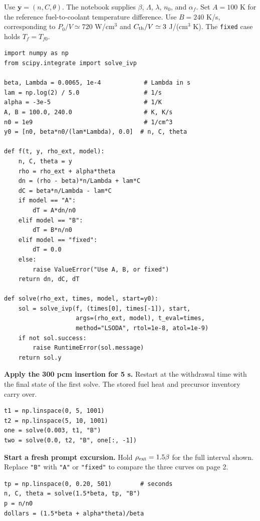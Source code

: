 \documentclass[compact]{ne630handout}
\begin{document}
\begin{handoutflow}
\columnbreak
{}

Use $\mathbf y=(n,C,\theta)$. The notebook supplies $\beta$, $\Lambda$, $\lambda$, $n_0$, and $\alpha_f$. Set $A=100$ K for the reference fuel-to-coolant temperature difference. Use $B=240$ K/s, corresponding to $P_0/V\simeq720$ W/cm$^3$ and $C_{\rm th}/V\simeq3$ J/(cm$^3$ K). The \texttt{fixed} case holds $T_f=T_{f0}$.

\begin{lstlisting}[style=feedback python]
import numpy as np
from scipy.integrate import solve_ivp

beta, Lambda = 0.0065, 1e-4            # Lambda in s
lam = np.log(2) / 5.0                  # 1/s
alpha = -3e-5                          # 1/K
A, B = 100.0, 240.0                    # K, K/s
n0 = 1e9                               # 1/cm^3
y0 = [n0, beta*n0/(lam*Lambda), 0.0]  # n, C, theta

def f(t, y, rho_ext, model):
    n, C, theta = y
    rho = rho_ext + alpha*theta
    dn = (rho - beta)*n/Lambda + lam*C
    dC = beta*n/Lambda - lam*C
    if model == "A":
        dT = A*dn/n0
    elif model == "B":
        dT = B*n/n0
    elif model == "fixed":
        dT = 0.0
    else:
        raise ValueError("Use A, B, or fixed")
    return dn, dC, dT

def solve(rho_ext, times, model, start=y0):
    sol = solve_ivp(f, (times[0], times[-1]), start,
                    args=(rho_ext, model), t_eval=times,
                    method="LSODA", rtol=1e-8, atol=1e-9)
    if not sol.success:
        raise RuntimeError(sol.message)
    return sol.y
\end{lstlisting}

\textbf{Apply the 300 pcm insertion for 5 s.}
Restart at the withdrawal time with the final state of the first solve. The stored fuel heat and precursor inventory carry over.
\begin{lstlisting}[style=feedback python]
t1 = np.linspace(0, 5, 1001)
t2 = np.linspace(5, 10, 1001)
one = solve(0.003, t1, "B")
two = solve(0.0, t2, "B", one[:, -1])
\end{lstlisting}

\textbf{Start a fresh prompt excursion.} Hold $\rho_{\rm ext}=1.5\beta$ for the full interval shown. Replace \texttt{"B"} with \texttt{"A"} or \texttt{"fixed"} to compare the three curves on page 2.
\begin{lstlisting}[style=feedback python]
tp = np.linspace(0, 0.20, 501)        # seconds
n, C, theta = solve(1.5*beta, tp, "B")
p = n/n0
dollars = (1.5*beta + alpha*theta)/beta
\end{lstlisting}
\end{handoutflow}
\end{document}
